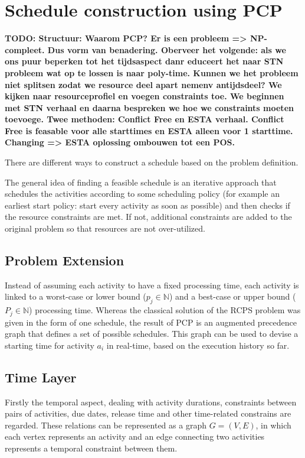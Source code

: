 \documentclass{article}
\newcommand{\TODO}[1]{{\color{red}\textbf{TODO: #1}}}
\begin{document}
\newpage

\section{Schedule construction using PCP}
\TODO{Structuur: Waarom PCP? Er is een probleem => NP-compleet. Dus vorm van benadering. Oberveer het volgende: als we ons puur beperken tot het tijdsaspect danr educeert het naar STN probleem wat op te lossen is naar poly-time. Kunnen we het probleem niet splitsen zodat we resource deel apart nemenv antijdsdeel? We kijken naar resourceprofiel en voegen constraints toe. We beginnen met STN verhaal en daarna bespreken we hoe we constraints moeten toevoege. Twee methoden: Conflict Free en ESTA verhaal. Conflict Free is feasable voor alle starttimes en ESTA alleen voor 1 starttime. Changing => ESTA oplossing ombouwen tot een POS. }  

There are different ways to construct a schedule based on the problem definition. 

The general idea of finding a feasible schedule is an iterative approach that schedules the activities according to some scheduling policy (for example an earliest start policy: start every activity as soon as possible) and then checks if the resource constraints are met. If not, additional constraints are added to the original problem so that resources are not over-utilized.

\subsection{Problem Extension}
Instead of assuming each activity to have a fixed processing time, each activity is linked to a worst-case or lower bound ($p_{j} \in \mathbb{N}$) and a best-case or upper bound ($P_{j} \in \mathbb{N}$) processing time. Whereas the classical solution of the RCPS problem was given in the form of one schedule, the result of PCP is an augmented precedence graph that defines a set of possible schedules. This graph can be used to devise a starting time for activity $a_i$ in real-time, based on the execution history so far. 

\subsection{Time Layer}
Firstly the temporal aspect, dealing with activity durations, constraints between pairs of activities, due dates, release time and other time-related constrains are regarded. These relations can be represented as a graph $G=(V,E)$, in which each vertex represents an activity and an edge connecting two activities represents a temporal constraint between them.
\end{document}
